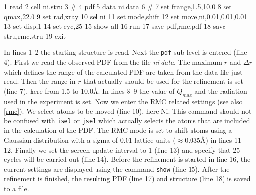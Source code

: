\begin{MacVerbatim}
      1 read
      2 cell ni.stru
      3 #
      4 pdf
      5   data ni.data
      6 #
      7   set frange,1.5,10.0
      8   set qmax,22.0
      9   set rad,xray
     10   sel ni
     11   set mode,shift
     12   set move,ni,0.01,0.01,0.01
     13   set disp,1
     14   set cyc,25
     15   show all
     16   run
     17   save pdf,rmc.pdf
     18   save stru,rmc.stru
     19 exit
\end{MacVerbatim}
%
In lines 1--2 the starting structure is read. Next the {\tt pdf}
sub level is entered (line 4). First we read the observed PDF from
the file {\it ni.data}. The maximum $r$ and $\Delta r$ which defines
the range of the calculated PDF are taken from the data file just
read. Then the range in $r$ that actually should be used for the
refinement is set (line 7), here from 1.5 to 10.0\AA. In lines 8--9
the value of $Q_{max}$ and the radiation used in the experiment is
set. Now we enter the RMC related settings (see also \ref{rmc}). We
select atoms to be moved (line 10), here Ni. This command should not
be confused with {\tt isel} or {\tt jsel} which actually selects the
atoms that are included in the calculation of the PDF. The RMC mode
is set to shift atoms using a Gaussian distribution with a sigma of
0.01 lattice units ($\approx 0.035$\AA) in lines 11--12. Finally we
set the screen update interval to 1 (line 13) and specify that 25
cycles will be carried out (line 14). Before the refinement is
started in line 16, the current settings are displayed using the
command {\tt show} (line 15). After the refinement is finished, the
resulting PDF (line 17) and structure (line 18) is saved to a file.
\par

